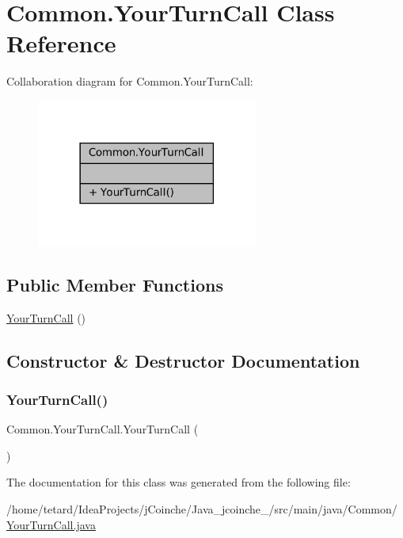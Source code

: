 \hypertarget{classCommon_1_1YourTurnCall}{}\section{Common.\+Your\+Turn\+Call Class Reference}
\label{classCommon_1_1YourTurnCall}


Collaboration diagram for Common.\+Your\+Turn\+Call\+:
\nopagebreak
\begin{figure}[H]
\begin{center}
\leavevmode
\includegraphics[width=206pt]{classCommon_1_1YourTurnCall__coll__graph}
\end{center}
\end{figure}
\subsection*{Public Member Functions}
\begin{DoxyCompactItemize}
\item 
\mbox{\hyperlink{classCommon_1_1YourTurnCall_a9255f89d4edc22502ed78ef9b06ffe4a}{Your\+Turn\+Call}} ()
\end{DoxyCompactItemize}


\subsection{Constructor \& Destructor Documentation}
\mbox{\label{classCommon_1_1YourTurnCall_a9255f89d4edc22502ed78ef9b06ffe4a}} 
\subsubsection{\texorpdfstring{Your\+Turn\+Call()}{YourTurnCall()}}
{\footnotesize\ttfamily Common.\+Your\+Turn\+Call.\+Your\+Turn\+Call (\begin{DoxyParamCaption}{ }\end{DoxyParamCaption})\hspace{0.3cm}{\ttfamily [inline]}}



The documentation for this class was generated from the following file\+:\begin{DoxyCompactItemize}
\item 
/home/tetard/\+Idea\+Projects/j\+Coinche/\+Java\+\_\+jcoinche\+\_/src/main/java/\+Common/\mbox{\hyperlink{YourTurnCall_8java}{Your\+Turn\+Call.\+java}}\end{DoxyCompactItemize}
